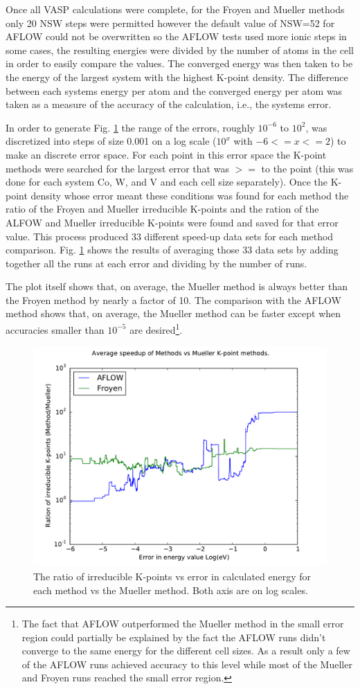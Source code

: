 \documentclass[12pt]{article}
\begin{document}
Once all VASP calculations were complete, for the Froyen and Mueller
methods only 20 NSW steps were permitted however the default value of
NSW=52 for AFLOW could not be overwritten so the AFLOW tests used more
ionic steps in some cases, the resulting energies were divided by the
number of atoms in the cell in order to easily compare the values. The
converged energy was then taken to be the energy of the largest system
with the highest K-point density. The difference between each systems
energy per atom and the converged energy per atom was taken as a
measure of the accuracy of the calculation, i.e., the systems error.

In order to generate Fig. \ref{fig:all_vs_Mueller} the range of the
errors, roughly $10^{-6}$ to $10^2$, was discretized into steps of
size 0.001 on a log scale ($10^x$ with $-6<=x<=2$) to make an discrete
error space. For each point in this error space the K-point methods
were searched for the largest error that was $>=$ to the point (this
was done for each system Co, W, and V and each cell size
separately). Once the K-point density whose error meant these
conditions was found for each method the ratio of the Froyen and
Mueller irreducible K-points and the ration of the ALFOW and Mueller
irreducible K-points were found and saved for that error value. This
process produced 33 different speed-up data sets for each method
comparison. Fig. \ref{fig:all_vs_Mueller} shows the results of averaging
those 33 data sets by adding together all the runs at each error and
dividing by the number of runs.

The plot itself shows that, on average, the Mueller method is always
better than the Froyen method by nearly a factor of 10. The comparison
with the AFLOW method shows that, on average, the Mueller method can
be faster except when accuracies smaller than $10^{-5}$ are
desired\footnote{The fact that AFLOW outperformed the Mueller method
  in the small error region could partially be explained by the fact
  the AFLOW runs didn't converge to the same energy for the different
  cell sizes. As a result only a few of the AFLOW runs achieved
  accuracy to this level while most of the Mueller and Froyen runs
  reached the small error region.}.

\begin{figure}
  \includegraphics[scale=0.75]{All_vs_Mueller.pdf}
  \caption{The ratio of irreducible K-points vs error in calculated
    energy for each method vs the Mueller method. Both axis are on log scales.}
  \label{fig:all_vs_Mueller}
\end{figure}
\end{document}

